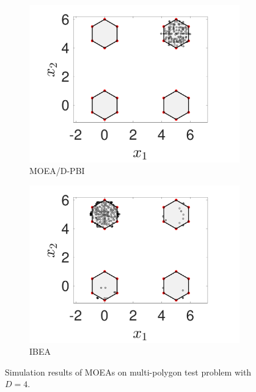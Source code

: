 \documentclass[conference]{IEEEtran}
\begin{document}
\begin{figure}[htbp]
    \begin{subfigure}[b]{.24\textwidth}
    \includegraphics[width=\linewidth]{Section5/dim4/PS/MOEAD_PBI}
    \caption{MOEA/D-PBI}
    \end{subfigure}
    \begin{subfigure}[b]{.24\textwidth}
    \includegraphics[width=\linewidth]{Section5/dim4/PS/IBEA}
    \caption{IBEA}
    \end{subfigure}

    \caption{Simulation results of MOEAs on multi-polygon test problem with $D=4$.}
    \label{fig: MOEAs PS dim=4}
\end{figure}
\end{document}
